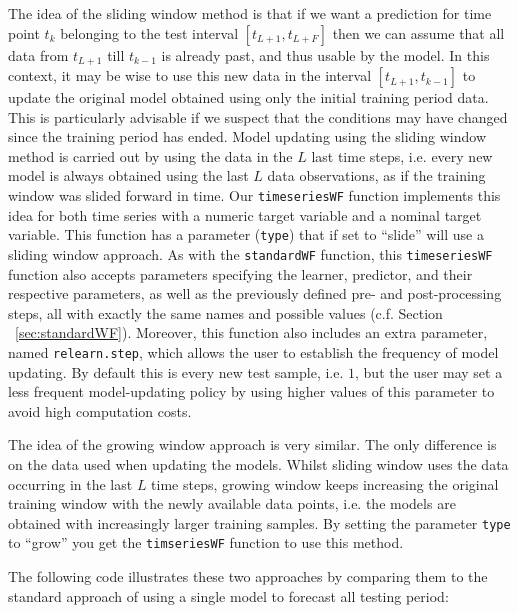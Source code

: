 \documentclass[10pt,a4paper]{article}\usepackage[]{graphicx}\usepackage[]{color}
\begin{document}
The idea of the
sliding window method is that if we want a prediction for time point
$t_k$ belonging to the test interval $[t_{L+1},t_{L+F}]$ then we can
assume that all data from $t_{L+1}$ till $t_{k-1}$ is already past,
and thus usable by the model. In this context, it may be wise to use
this new data in the interval $[t_{L+1},t_{k-1}]$ to update the
original model obtained using only the initial training period data. This is
particularly advisable if we suspect that the conditions may have
changed since the training period has ended. Model updating using the
sliding window method is carried out by using the data in the $L$ last
time steps, i.e. every new model is always obtained using the last $L$
data observations, as if the training window was slided forward in
time. Our \texttt{timeseriesWF} function implements this idea for
both time series with a numeric target variable and a nominal target
variable. This function has a parameter (\texttt{type}) that if set to
``slide'' will use a sliding window approach. As with the
\texttt{standardWF} function, this \texttt{timeseriesWF} function
also accepts parameters specifying the learner, predictor, 
and their respective parameters, as well as the previously defined pre- and post-processing steps, all with exactly the same names and possible values (c.f. Section ~\ref{sec:standardWF}). Moreover, this function also includes
an extra parameter, named \texttt{relearn.step}, which allows the user
to establish the frequency of model updating. By default this is every
new test sample, i.e. $1$, but the user may set a less frequent
model-updating policy by using higher values of this parameter to avoid high computation costs. 

The
idea of the growing window approach is very similar. The only difference
is on the data used when updating the models. Whilst sliding window
uses the data occurring in the last $L$ time steps, growing window
keeps increasing the original training window with the newly available
data points, i.e. the models are obtained with increasingly larger
training samples. By setting the parameter \texttt{type} to ``grow''
you get the \texttt{timseriesWF} function to use this method.

The following code illustrates these two approaches by comparing them to the standard approach of using a single model to forecast all testing period:
\end{document}
